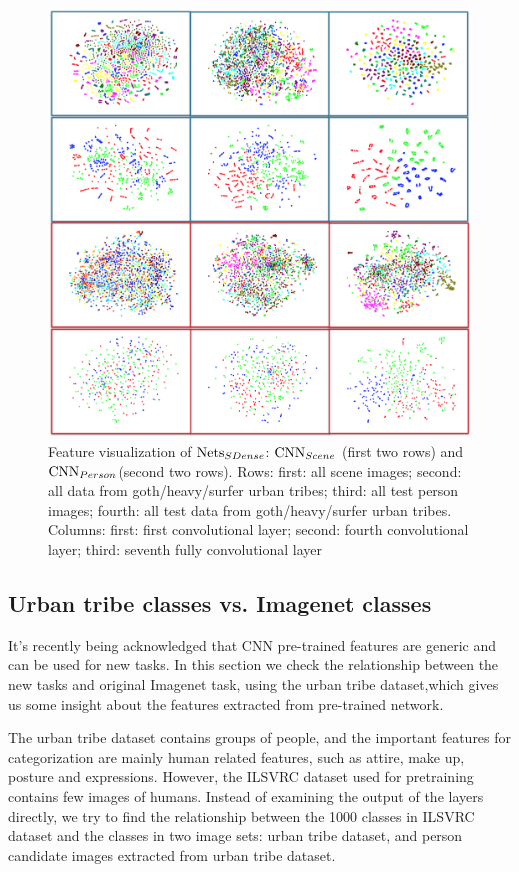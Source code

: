\documentclass[10pt,twocolumn,letterpaper]{article}
\begin{document}
\begin{figure}[!t]
\begin{center}
\includegraphics[width=0.8\linewidth]{tsne}
\end{center}
\caption{Feature visualization of  $\textup{Nets}_{SDense}$: $\textup{CNN}_{Scene}$ (first two rows) and $\textup{CNN}_{Person}$(second two rows). Rows: first: all scene images; second: all data from goth/heavy/surfer urban tribes; third: all test person images; fourth: all test data from goth/heavy/surfer urban tribes. Columns:  first: first convolutional layer; second: fourth convolutional layer; third: seventh fully convolutional layer}
\label{tsne}
\end{figure}

\subsection{Urban tribe classes vs. Imagenet classes }
It's recently being acknowledged that CNN pre-trained features are generic and can be used for new tasks. In this section we check the relationship between the new tasks and original Imagenet task, using the urban tribe dataset,which gives us some insight about the features extracted from pre-trained network.

The urban tribe dataset contains groups of people, and the important features for categorization are mainly human related features, such as attire, make up, posture and expressions. However, the ILSVRC dataset used for pretraining contains few images of humans. Instead of examining the output of the layers directly, we try to find the relationship between the 1000 classes in ILSVRC dataset and the classes in two image sets: urban tribe dataset, and person candidate images extracted from urban tribe dataset.
\end{document}
